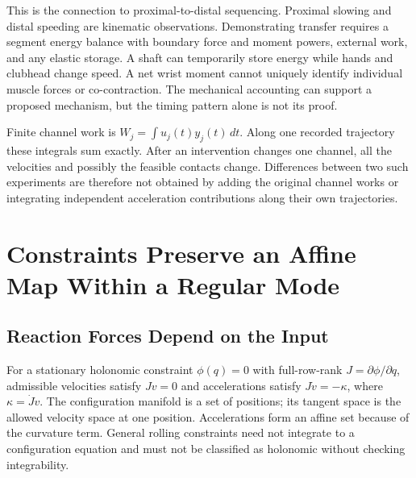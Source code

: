 This is the connection to proximal-to-distal sequencing. Proximal slowing and distal speeding are kinematic observations. Demonstrating transfer requires a segment energy balance with boundary force and moment powers, external work, and any elastic storage. A shaft can temporarily store energy while hands and clubhead change speed. A net wrist moment cannot uniquely identify individual muscle forces or co-contraction. The mechanical accounting can support a proposed mechanism, but the timing pattern alone is not its proof.

Finite channel work is $W_j=\int u_j(t)y_j(t)\,dt$. Along one recorded trajectory these integrals sum exactly. After an intervention changes one channel, all the velocities and possibly the feasible contacts change. Differences between two such experiments are therefore not obtained by adding the original channel works or integrating independent acceleration contributions along their own trajectories.

\section{Constraints Preserve an Affine Map Within a Regular Mode}

\subsection{Reaction Forces Depend on the Input}

For a stationary holonomic constraint $\phi(q)=0$ with full-row-rank $J=\partial\phi/\partial q$, admissible velocities satisfy $Jv=0$ and accelerations satisfy $J\dot v=-\kappa$, where $\kappa=\dot Jv$. The configuration manifold is a set of positions; its tangent space is the allowed velocity space at one position. Accelerations form an affine set because of the curvature term. General rolling constraints need not integrate to a configuration equation and must not be classified as holonomic without checking integrability.

